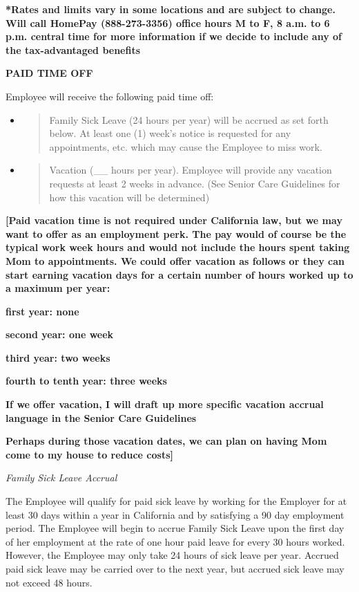 \documentclass[]{article}
\begin{document}
\textbf{*Rates and limits vary in some locations and are subject to
change. Will call HomePay (888-273-3356) office hours M to F, 8 a.m. to
6 p.m. central time for more information if we decide to include any of
the tax-advantaged benefits}

\textbf{PAID TIME OFF}

Employee will receive the following paid time off:

\begin{itemize}
\item
  \begin{quote}
  Family Sick Leave (24 hours per year) will be accrued as set forth
  below. At least one (1) week's notice is requested for any
  appointments, etc. which may cause the Employee to miss work.
  \end{quote}
\end{itemize}

\begin{itemize}
\item
  \begin{quote}
  Vacation (\_\_ hours per year). Employee will provide any vacation
  requests at least 2 weeks in advance. (See Senior Care Guidelines for
  how this vacation will be determined)
  \end{quote}
\end{itemize}

\textbf{{[}Paid vacation time is not required under California law, but
we may want to offer as an employment perk. The pay would of course be
the typical work week hours and would not include the hours spent taking
Mom to appointments. We could offer vacation as follows or they can
start earning vacation days for a certain number of hours worked up to a
maximum per year: }

\textbf{first year: none}

\textbf{second year: one week}

\textbf{third year: two weeks}

\textbf{fourth to tenth year: three weeks }

\textbf{If we offer vacation, I will draft up more specific vacation
accrual language in the Senior Care Guidelines}

\textbf{Perhaps during those vacation dates, we can plan on having Mom
come to my house to reduce costs{]}}

\emph{Family Sick Leave Accrual}

The Employee will qualify for paid sick leave by working for the
Employer for at least 30 days within a year in California and by
satisfying a 90 day employment period. The Employee will begin to accrue
Family Sick Leave upon the first day of her employment at the rate of
one hour paid leave for every 30 hours worked. However, the Employee may
only take 24 hours of sick leave per year. Accrued paid sick leave may
be carried over to the next year, but accrued sick leave may not exceed
48 hours.
\end{document}
